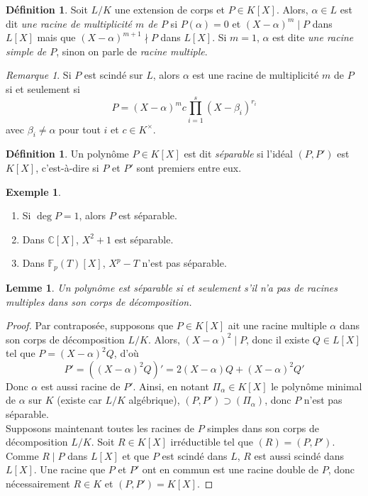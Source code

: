 \documentclass{article}
\newcommand{\C}{\mathbb{C}}
\newcommand{\F}{\mathbb{F}}
\theoremstyle{plain}
\newtheorem{lemma}[theorem]{Lemme}
\theoremstyle{definition}
\newtheorem{definition}[theorem]{Définition}
\newtheorem{example}[theorem]{Exemple}
\theoremstyle{remark}
\newtheorem*{remark}{Remarque}
\begin{document}
\begin{definition}
    Soit $L/K$ une extension de corps et $P \in K[X]$. Alors, $\alpha \in L$ est dit \emph{une racine de multiplicité $m$ de $P$} si $P(\alpha) = 0$ et $(X-\alpha)^m \mid P$ dans $L[X]$ mais que $(X-\alpha)^{m+1} \nmid P$ dans $L[X]$. Si $m=1$, $\alpha$ est dite \emph{une racine simple de $P$}, sinon on parle de \emph{racine multiple}. 
\end{definition}

\begin{remark}
    Si $P$ est scindé sur $L$, alors $\alpha$ est une racine de multiplicité $m$ de $P$ si et seulement si
    \[P = (X-\alpha)^m c \prod_{i=1}^s (X-\beta_i)^{r_i}\]
    avec $\beta_i \ne \alpha$ pour tout $i$ et $c \in K^\times$.
\end{remark}

\begin{definition}
    Un polynôme $P \in K[X]$ est dit \emph{séparable} si l'idéal $(P,P')$ est $K[X]$, c'est-à-dire si $P$ et $P'$ sont premiers entre eux.
\end{definition}

\begin{example} \leavevmode
    \begin{enumerate}
        \item Si $\deg P = 1$, alors $P$ est séparable.
        \item Dans $\C[X]$, $X^2 + 1$ est séparable.
        \item Dans $\F_p(T)[X]$, $X^p - T$ n'est pas séparable.
    \end{enumerate}
\end{example}

\begin{lemma}
    Un polynôme est séparable si et seulement s'il n'a pas de racines multiples dans son corps de décomposition.
\end{lemma}

\begin{proof}
    Par contraposée, supposons que $P \in K[X]$ ait une racine multiple $\alpha$ dans son corps de décomposition $L/K$. Alors, $(X-\alpha)^2 \mid P$, donc il existe $Q \in L[X]$ tel que $P=(X-\alpha)^2 Q$, d'où
    \[P' = ((X-\alpha)^2 Q)' = 2 (X-\alpha)Q + (X-\alpha)^2 Q'\]
    Donc $\alpha$ est aussi racine de $P'$. Ainsi, en notant $\Pi_\alpha \in K[X]$ le polynôme minimal de $\alpha$ sur $K$ (existe car $L/K$ algébrique), $(P,P') \supset (\Pi_\alpha)$, donc $P$ n'est pas séparable. \\
    Supposons maintenant toutes les racines de $P$ simples dans son corps de décomposition $L/K$. Soit $R \in K[X]$ irréductible tel que $(R) = (P,P')$. Comme $R \mid P$ dans $L[X]$ et que $P$ est scindé dans $L$, $R$ est aussi scindé dans $L[X]$. Une racine que $P$ et $P'$ ont en commun est une racine double de $P$, donc nécessairement $R \in K$ et $(P,P') = K[X]$.
\end{proof}
\end{document}
